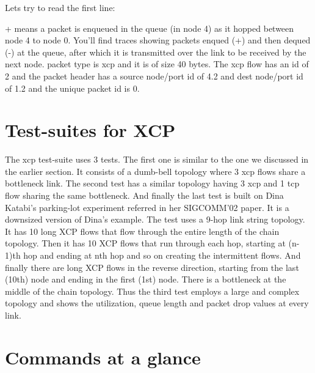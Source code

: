   Lets try to read the first line:

  
  + means a packet is enqueued in the queue (in node 4) as it hopped
  between node 4 to node 0. You'll find traces showing packets enqued
  (+) and then dequed (-) at the queue, after which it is transmitted
  over the link to be received by the next node. packet
  type is xcp and it is of size 40 bytes. The xcp flow has an id of 2
  and the packet header has a source node/port id of 4.2 and dest
  node/port id of 1.2 and the unique packet id is 0.
    
  \section{Test-suites for XCP}
  \label{sec:test for xcp}
  
  The xcp test-suite uses 3 tests. The first one is similar to the one
  we discussed in the earlier section. It consists of a dumb-bell
  topology where 3 xcp flows share a bottleneck link. The second test
  has a similar topology having 3 xcp and 1 tcp flow sharing the same
  bottleneck. And finally the last test is built on Dina Katabi's
  parking-lot experiment referred in her SIGCOMM'02 paper. It is a
  downsized version of Dina's example. The test uses a 9-hop
  link string topology. It has 10 long XCP flows that flow through the
  entire length of the chain topology. Then it has 10 XCP flows that run
  through each hop, starting at (n-1)th hop and ending at nth hop and so
  on creating the intermittent flows. And finally there are long XCP
  flows in the reverse direction, 
  starting from the last (10th) node and ending in the first (1st) node.
  There is a bottleneck at the middle of the chain topology. Thus the
  third test employs a large and complex topology and shows the
  utilization, queue length and packet drop values at every link.
  

  \section{Commands at a glance}
  \label{sec:commands-xcp}
  
